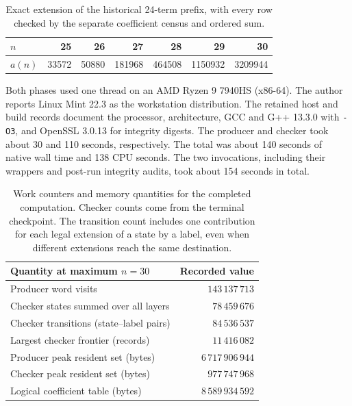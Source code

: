 \documentclass[11pt]{article}
\begin{document}
\begin{table}[htbp]
\centering
\begin{tabular}{lrrrrrr}
\toprule
\(n\)    & 25 & 26 & 27 & 28 & 29 & 30 \\
\midrule
\(a(n)\) & 33572 & 50880 & 181968 & 464508 & 1150932 & 3209944 \\
\bottomrule
\end{tabular}
\caption{Exact extension of the historical 24-term prefix, with every
row checked by the separate coefficient census and ordered sum.}
\label{tab:extension}
\end{table}

Both phases used one thread on an AMD Ryzen 9 7940HS (x86-64).
The author reports Linux Mint 22.3 as the workstation distribution.
The retained host and build records document the processor, architecture,
GCC and G++ 13.3.0 with \texttt{-O3}, and OpenSSL 3.0.13 for
integrity digests.
The producer and checker took about 30 and 110 seconds, respectively.
The total was about 140 seconds of native wall time and 138 CPU seconds.
The two invocations, including their wrappers and post-run
integrity audits, took about 154 seconds in total.

\begin{table}[htbp]
\centering
\begin{tabular}{lr}
\toprule
Quantity at maximum \(n=30\) & Recorded value \\
\midrule
Producer word visits & \(143\,137\,713\) \\
Checker states summed over all layers & \(78\,459\,676\) \\
Checker transitions (state--label pairs) & \(84\,536\,537\) \\
Largest checker frontier (records) & \(11\,416\,082\) \\
Producer peak resident set (bytes) & \(6\,717\,906\,944\) \\
Checker peak resident set (bytes) & \(977\,747\,968\) \\
Logical coefficient table (bytes) & \(8\,589\,934\,592\) \\
\bottomrule
\end{tabular}
\caption{Work counters and memory quantities for the completed computation.
Checker counts come from the terminal checkpoint. The transition count
includes one contribution for each legal extension of a state by a label,
even when different extensions reach the same destination.}
\label{tab:work}
\end{table}
\end{document}
